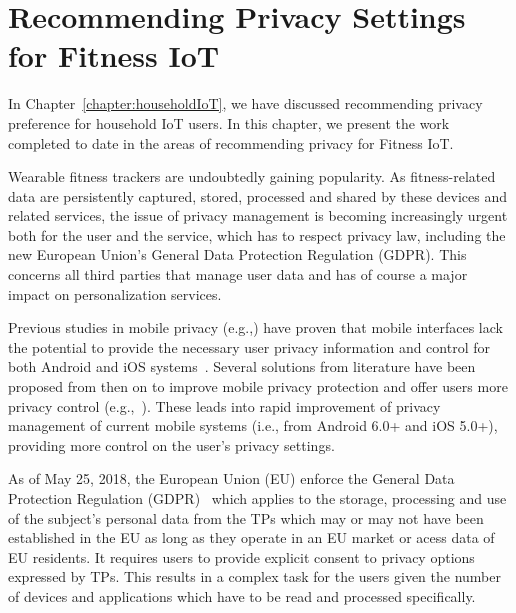 \chapter{Recommending Privacy Settings for Fitness IoT}\label{chapter:fitnessIoT}

In Chapter~\ref{chapter:householdIoT}, we have discussed recommending privacy preference for household IoT users. In this chapter, we present the work completed to date in the areas of recommending privacy for Fitness IoT. 

Wearable fitness trackers are undoubtedly gaining popularity. As fitness-related data are persistently captured, stored, processed and shared by these devices and related services, the issue of privacy management is becoming increasingly urgent both for the user and the service, which has to respect privacy law, including the new European Union's General Data Protection Regulation (GDPR). This concerns all third parties that manage user data and has of course a major impact on personalization services.

Previous studies in mobile privacy (e.g.,\cite{felt2012android}) have proven that mobile interfaces lack the potential to provide the necessary user privacy information and control for both Android and iOS systems~\cite{lin2014modeling}. Several solutions from literature have been proposed from then on to improve mobile privacy protection and offer users more privacy control (e.g.,~\cite{beresford2011mockdroid}). These leads into rapid improvement of privacy management of current mobile systems (i.e., from Android 6.0+ and iOS 5.0+), providing more control on the user's privacy settings.

As of May 25, 2018, the European Union (EU) enforce the General Data Protection Regulation (GDPR)~\cite{ref:GDPR} which applies to the storage, processing and use of the subject's personal data from the TPs which may or may not have been established in the EU as long as they operate in an EU market or acess data of EU residents. It requires users to provide explicit consent to privacy options expressed by TPs. This results in a complex task for the users given the number of devices and applications which have to be read and processed specifically.